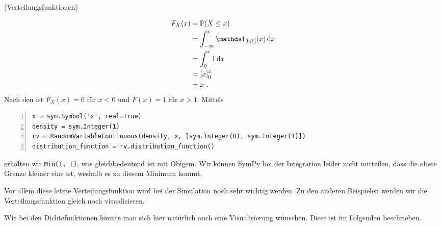 \begin{Beispiel}{(Verteilungsfunktionen)}
\begin{enumerate}[label=(\roman*)]
\begin{align*}
F_X(x) &= \mathbb{P}(X \leq x)\\
&= \int_{-\infty}^x \indi_{[0, 1]}(x) \d x\\
&= \int_0^x 1 \d x\\
&= \left[ x \right]_0^x\\
&= x~.
\end{align*}
Nach den \hyperlink{Satz:EigVertFun}{} ist $F_X(x) = 0$ für $x < 0$ und $F(x) = 1$ für $x > 1$. Mittels
\begin{lstlisting}[numbers=left, numberstyle=\tiny\color{codegray}]
x = sym.Symbol('x', real=True)
density = sym.Integer(1)
rv = RandomVariableContinuous(density, x, [sym.Integer(0), sym.Integer(1)])
distribution_function = rv.distribution_function()
\end{lstlisting}
erhalten wir \lstinline|Min(1, t)|, was gleichbedeutend ist mit Obigem. Wir können SymPy bei der Integration leider nicht mitteilen, dass die obere Grenze kleiner eins ist, weshalb es zu diesem Minimum kommt.
\end{enumerate}
Vor allem diese letzte Verteilungsfunktion wird bei der Simulation noch sehr wichtig werden. Zu den anderen Beispielen werden wir die Verteilungsfunktion gleich noch visualisieren.
\end{Beispiel}

Wie bei den Dichtefunktionen könnte man sich hier natürlich auch eine Visualisierung wünschen. Diese ist im Folgenden beschrieben.

